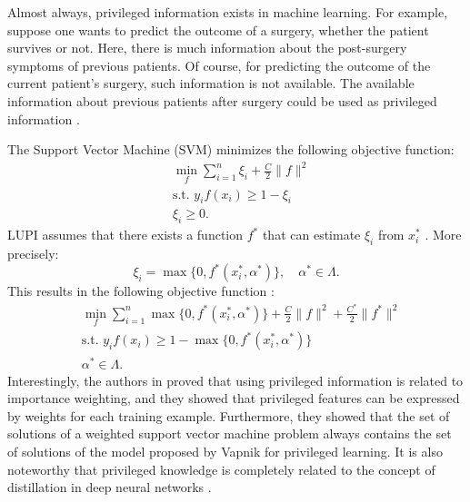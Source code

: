 \documentclass[12pt]{article}
\begin{document}
	Almost always, privileged information exists in machine learning. For example, suppose one wants to predict the outcome of a surgery, whether the patient survives or not. Here, there is much information about the post-surgery symptoms of previous patients. Of course, for predicting the outcome of the current patient's surgery, such information is not available. The available information about previous patients after surgery could be used as privileged information \cite{vapnik2015learning}.
	
	The Support Vector Machine (SVM) minimizes the following objective function:
	\begin{subequations}
		\label{eq:svm-obj}
		\begin{align}
			&\min_{f} \sum_{i=1}^{n} \xi_i + \frac{C}{2}\|f\|^2 \\
			&\text{s.t. } y_i f(x_i) \ge 1 - \xi_i \\
			&\xi_i \ge 0.
		\end{align}
	\end{subequations}
	LUPI assumes that there exists a function $f^*$ that can estimate $\xi_i$ from $x_i^*$ \cite{pekovic2013support}. More precisely:
	\begin{equation}
		\xi_i = \max\{0, f^*(x_i^*, \alpha^*)\}, \quad \alpha^* \in \Lambda.
	\end{equation}
	This results in the following objective function \cite{vapnik2015learning}:
	\begin{subequations}
		\label{eq:lupi-obj}
		\begin{align}
			&\min_{f} \sum_{i=1}^{n} \max\{0, f^*(x_i^*, \alpha^*)\} + \frac{C}{2}\|f\|^2 + \frac{C^*}{2}\|f^*\|^2 \\
			&\text{s.t. } y_i f(x_i) \ge 1 - \max\{0, f^*(x_i^*, \alpha^*)\} \\
			&\alpha^* \in \Lambda.
		\end{align}
	\end{subequations}
	Interestingly, the authors in \cite{lapedriza2013privileged} proved that using privileged information is related to importance weighting, and they showed that privileged features can be expressed by weights for each training example. Furthermore, they showed that the set of solutions of a weighted support vector machine problem always contains the set of solutions of the model proposed by Vapnik for privileged learning. It is also noteworthy that privileged knowledge is completely related to the concept of distillation in deep neural networks \cite{hinton2015distilling}.
	
\end{document}
